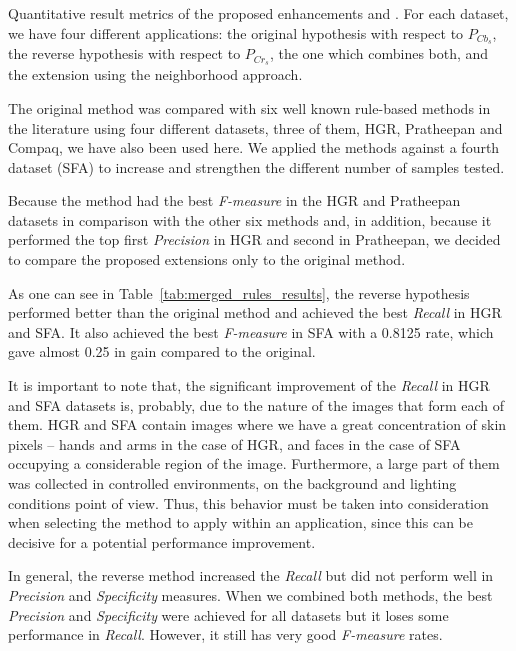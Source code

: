 \begin{table*}[ht]
\caption[Quantitative result metrics of the proposed enhancements and original method]{Quantitative result metrics of the proposed enhancements and \citet{brancati:17}. For each dataset, we have four different applications: the original hypothesis with respect to $P_{Cb_{s}}$, the reverse hypothesis with respect to $P_{Cr_{s}}$, the one which combines both, and the extension using the neighborhood approach.}
\label{tab:merged_rules_results}

\end{table*}

The original method was compared with six well known rule-based methods in the literature using four different datasets, three of them, HGR, Pratheepan and Compaq, we have also been used here. We applied the methods against a fourth dataset (SFA) to increase and strengthen the different number of samples tested.

Because the method had the best \textit{F-measure} in the HGR and Pratheepan datasets in comparison with the other six methods and, in addition, because it performed the top first \textit{Precision} in HGR and second in Pratheepan, we decided to compare the proposed extensions only to the original method.

As one can see in Table~\ref{tab:merged_rules_results}, the reverse hypothesis performed better than the original method and achieved the best \textit{Recall} in HGR and SFA. It also achieved the best \textit{F-measure} in SFA with a 0.8125 rate, which gave almost 0.25 in gain compared to the original.

It is important to note that, the significant improvement of the \textit{Recall} in HGR and SFA datasets is, probably, due to the nature of the images that form each of them. HGR and SFA contain images where we have a great concentration of skin pixels -- hands and arms in the case of HGR, and faces in the case of SFA occupying a considerable region of the image. Furthermore, a large part of them was collected in controlled environments, on the background and lighting conditions point of view. Thus, this behavior must be taken into consideration when selecting the method to apply within an application, since this can be decisive for a potential performance improvement.

In general, the reverse method increased the \textit{Recall} but did not perform well in \textit{Precision} and \textit{Specificity} measures. When we combined both methods, the best \textit{Precision} and \textit{Specificity} were achieved for all datasets but it loses some performance in \textit{Recall}. However, it still has very good \textit{F-measure} rates.

